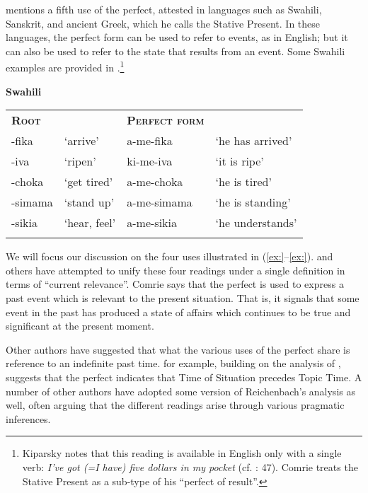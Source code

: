 \citet{Kiparsky2002} mentions a fifth use of the perfect, attested in languages such as Swahili, Sanskrit, and ancient Greek, which he calls the Stative Present. In these languages, the perfect form can be used to refer to events, as in English; but it can also be used to refer to the state that results from an event. Some Swahili examples are provided in .\footnote{Kiparsky notes that this reading is available in English only with a single verb: \textit{I’ve got (=I have) five dollars in my pocket} (cf. \citealt{Jesperson1931}: 47). Comrie treats the Stative Present as a sub-type of his “perfect of result”.}


\ea
\textbf{Swahili} \citet{Ashton1944}
\z

\begin{tabularx}{\textwidth}{XXXX}
\lsptoprule
\bfseries\scshape Root &  & \bfseries\scshape Perfect form & \\
-fika & ‘arrive’ & a-me-fika & ‘he has arrived’\\
-iva & ‘ripen’ & ki-me-iva & ‘it is ripe’\\
-choka & ‘get tired’ & a-me-choka & ‘he is tired’\\
-simama & ‘stand up’ & a-me-simama & ‘he is standing’\\
-sikia & ‘hear, feel’ & a-me-sikia & ‘he understands’\\
\lspbottomrule
\end{tabularx}

We will focus our discussion on the four uses illustrated in (\ref{ex:}--\ref{ex:}). \citet{Comrie1976} and others have attempted to unify these four readings under a single definition in terms of “current relevance”. Comrie says that the perfect is used to express a past event which is relevant to the present situation. That is, it signals that some event in the past has produced a state of affairs which continues to be true and significant at the present moment.



Other authors have suggested that what the various uses of the perfect share is reference to an indefinite past time. \citet{Klein1992,Klein1994} for example, building on the analysis of \citet{Reichenbach1947}, suggests that the perfect indicates that Time of Situation precedes Topic Time. A number of other authors have adopted some version of Reichenbach’s analysis as well, often arguing that the different readings arise through various pragmatic inferences.



